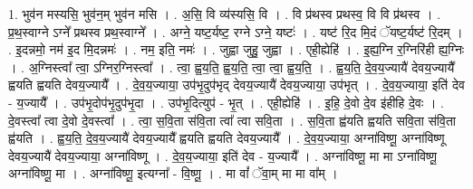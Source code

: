 \documentclass[17pt]{extarticle}
\begin{document}
1. भुव॑न मस्यसि॒ भुव॑न॒म् भुव॑न मसि । . अ॒सि॒ वि व्य॑स्यसि॒ वि । . वि प्र॑थस्व प्रथस्व॒ वि वि प्र॑थस्व । . प्र॒थ॒स्वाग्ने ऽग्ने᳚ प्रथस्व प्रथ॒स्वाग्ने᳚ । . अग्ने॒ यष्ट॒र्यष्ट॒ रग्ने ऽग्ने॒ यष्टः॑ । . यष्ट॑ रि॒द मि॒दं ॅयष्ट॒र्यष्ट॑ रि॒दम् । . इ॒दन्नमो॒ नम॑ इ॒द मि॒दन्नमः॑ । . नम॒ इति॒ नमः॑ । . जुह्वा जुहु॒ जुह्वा । . एही॒ह्येहि॑ । . इ॒ह्य॒ग्नि र॒ग्निरि॑ही ह्य॒ग्निः । . अ॒ग्निस्त्वा᳚ त्वा॒ ऽग्निर॒ग्निस्त्वा᳚ । . त्वा॒ ह्व॒य॒ति॒ ह्व॒य॒ति॒ त्वा॒ त्वा॒ ह्व॒य॒ति॒ । . ह्व॒य॒ति॒ दे॒व॒य॒ज्यायै॑ देवय॒ज्यायै᳚ ह्वयति ह्वयति देवय॒ज्यायै᳚ । . दे॒व॒य॒ज्याया॒ उप॑भृ॒दुप॑भृद् देवय॒ज्यायै॑ देवय॒ज्याया॒ उप॑भृत् । . दे॒व॒य॒ज्याया॒ इति॑ देव - य॒ज्यायै᳚ । . उप॑भृ॒दोप॑भृ॒दुप॑भृ॒दा । . उप॑भृ॒दित्युप॑ - भृ॒त् । . एही॒ह्येहि॑ । . इ॒हि॒ दे॒वो दे॒व इ॑हीहि दे॒वः । . दे॒वस्त्वा᳚ त्वा दे॒वो दे॒वस्त्वा᳚ । . त्वा॒ स॒वि॒ता स॑वि॒ता त्वा᳚ त्वा सवि॒ता । . स॒वि॒ता ह्व॑यति ह्वयति सवि॒ता स॑वि॒ता ह्व॑यति । . ह्व॒य॒ति॒ दे॒व॒य॒ज्यायै॑ देवय॒ज्यायै᳚ ह्वयति ह्वयति देवय॒ज्यायै᳚ । . दे॒व॒य॒ज्याया॒ अग्ना॑विष्णू॒ अग्ना॑विष्णू देवय॒ज्यायै॑ देवय॒ज्याया॒ अग्ना॑विष्णू । . दे॒व॒य॒ज्याया॒ इति॑ देव - य॒ज्यायै᳚ । . अग्ना॑विष्णू॒ मा मा ऽग्ना॑विष्णू॒ अग्ना॑विष्णू॒ मा । . अग्ना॑विष्णू॒ इत्यग्ना᳚ - वि॒ष्णू॒ । . मा वां᳚ ॅवा॒म् मा मा वा᳚म् । \newline
\end{document}
